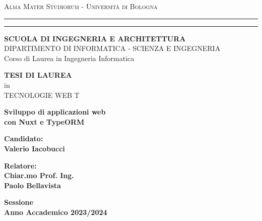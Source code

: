 \documentclass[11pt,a4paper]{report}
\begin{document}
\begin{titlepage}
	\begin{center}
	{{\Large{\textsc{Alma Mater Studiorum - Universit\`a di
	Bologna}}}} \rule[0.1cm]{15.8cm}{0.1mm}
	\rule[0.5cm]{15.8cm}{0.6mm}
	{\small{\bf SCUOLA DI INGEGNERIA E ARCHITETTURA}\\
	DIPARTIMENTO DI INFORMATICA - SCIENZA E INGEGNERIA\\
	Corso di Laurea in Ingegneria Informatica}
	\end{center}
	\vspace{15mm}
	\begin{center}
	{\large{\bf TESI DI LAUREA}}\\
	\vspace{2mm}
	{\large{in}}\\
	\vspace{2mm}
	{\large{TECNOLOGIE WEB T}}\\
	\end{center}
	\vspace{15mm}
	\begin{center}
	{\LARGE{\bf Sviluppo di applicazioni web}}\\
	\vspace{3mm}
	{\LARGE{\bf con Nuxt e TypeORM}}\\
	\end{center}
	\vspace{40mm}
	\par
	\noindent
	\begin{minipage}[t]{0.47\textwidth}
	{\large{\bf Candidato:\\
	Valerio Iacobucci}}
	\end{minipage}
	\hfill
	\begin{minipage}[t]{0.47\textwidth}\raggedleft
	{\large{\bf Relatore:\\
	Chiar.mo Prof. Ing.\\
	Paolo Bellavista}}
	\end{minipage}
	\vspace{20mm}
	\begin{center}
	{\large{\bf Sessione\\
	Anno Accademico 2023/2024 }}
	\end{center}
\end{titlepage}

\shipout\null

\begingroup
	\hypersetup{linkcolor=black}
	\tableofcontents
\endgroup

\newpage
\end{document}
